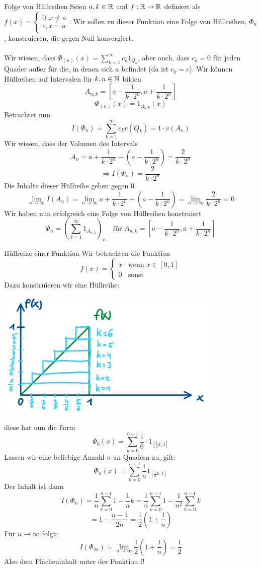 \begin{Beispiel}{Folge von Hüllreihen}
Seien $a, k\in \mathbb{R}$ und $f:\mathbb{R}\rightarrow\mathbb{R}$ definiert als $f(x)=\begin{cases}0, x\neq a \\ c, x=a\end{cases}$. Wir sollen zu dieser Funktion eine Folge von Hüllreihen, $\Phi_n$, konstruieren, die gegen Null konvergiert. \\ \\
Wir wissen, dass $\Phi_{(n)}(x) = \sum_{k=1}^\infty c_k 1_{Q_k}$, aber auch, dass $c_k=0$ für jeden Quader außer für die, in denen sich $a$ befindet (da ist $c_k=c$). Wir können Hüllreihen auf Intervalen für $k,n\in \mathbb{N}$ bilden
$$A_{n,k}=[a-\frac{1}{k\cdot 2^n}, a+\frac{1}{k\cdot 2^n}]$$
$$\Phi_{(n)}(x)= 1_{A_{n,k}}(x)$$
Betrachtet nun 
$$I(\Phi_n)=\sum_{k=1}^\infty c_k v(Q_k) = 1\cdot v(A_n)$$
Wir wissen, dass der Volumen des Intervals $$A_n=a+\frac{1}{k\cdot 2^n}-(a-\frac{1}{k\cdot 2^n})=\frac{2}{k\cdot 2^n}$$
$$\Rightarrow I(\Phi_n)=\frac{2}{k\cdot 2^n}$$
Die Inhalte dieser Hüllreihe gehen gegen 0
$$\lim_{n\rightarrow\infty}I(A_n)=\lim_{n\rightarrow\infty} a+\frac{1}{k\cdot 2^n}-(a-\frac{1}{k\cdot 2^n})=\lim_{n\rightarrow\infty}\frac{2}{k\cdot 2^n}=0$$
Wir haben nun erfolgreich eine Folge von Hüllreihen konstruiert
$$\Phi_n=(\sum_{k=1}^\infty 1_{A_{n,k}})_n \quad \mbox{für $A_{n,k}=[a-\frac{1}{k\cdot 2^n}, a+\frac{1}{k\cdot 2^n}]$}$$
\end{Beispiel}
\begin{Beispiel}{Hüllreihe einer Funktion}
Wir betrachten die Funktion 
\begin{equation*}
  f(x)=\begin{cases}
    x & \mbox{wenn $x\in [0,1]$} \\
    0 & \mbox{sonst}
\end{cases}  
\end{equation*}
Dazu konstruieren wir eine Hüllreihe:
            \begin{center}
    \includegraphics[width=0.80\textwidth]{Dateien/Hullreihe.png}
\end{center}
diese hat nun die Form $$\Phi_6(x)=\sum_{k=0}^{6-1}\frac{1}{6}\cdot 1_{[\frac{1}{6}k, 1]}$$ Lassen wir eine beliebige Anzahl $n$ an Quadern zu, gilt:
$$\Phi_n(x)=\sum_{k=0}^{n-1}\frac{1}{n}1_{[\frac{1}{n}k, 1]}$$
Der Inhalt ist dann
$$I(\Phi_n)=\frac{1}{n}\sum_{k=0}^{n-1} 1 -\frac{1}{n}k=\frac{1}{n}\sum_{k=0}^{n-1} 1 - \frac{1}{n^2}\sum_{k=0}^{n-1} k$$
$$=1-\frac{n-1}{2n}=\frac{1}{2}(1+\frac{1}{n})$$
Für $n\rightarrow \infty$ folgt:
$$I(\Phi_\infty)=\lim_{n\rightarrow\infty} \frac{1}{2}(1+\frac{1}{n})=\frac{1}{2}$$
Also dem Flächeninhalt unter der Funktion f!
\end{Beispiel}
